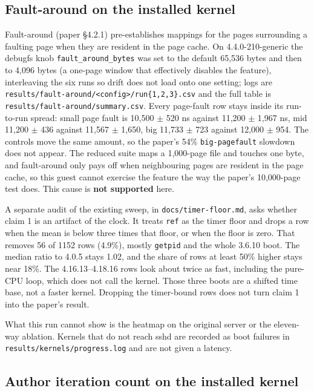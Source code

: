 \documentclass[11pt]{article}
\begin{document}
\subsection{Fault-around on the installed kernel}

Fault-around (paper \S4.2.1) pre-establishes mappings for the pages surrounding a faulting page when they are resident in the page cache. On 4.4.0-210-generic the debugfs knob \texttt{fault\_around\_bytes} was set to the default 65{,}536 bytes and then to 4{,}096 bytes (a one-page window that effectively disables the feature), interleaving the six runs so drift does not load onto one setting; logs are \texttt{results/fault-around/<config>/run\{1,2,3\}.csv} and the full table is \texttt{results/fault-around/summary.csv}. Every page-fault row stays inside its run-to-run spread: small page fault is 10{,}500 $\pm$ 520 ns against 11{,}200 $\pm$ 1{,}967 ns, mid 11{,}200 $\pm$ 436 against 11{,}567 $\pm$ 1{,}650, big 11{,}733 $\pm$ 723 against 12{,}000 $\pm$ 954. The controls move the same amount, so the paper's 54\% \texttt{big-pagefault} slowdown does not appear. The reduced suite maps a 1{,}000-page file and touches one byte, and fault-around only pays off when neighbouring pages are resident in the page cache, so this guest cannot exercise the feature the way the paper's 10{,}000-page test does. This cause is \textbf{not supported} here.

A separate audit of the existing sweep, in \texttt{docs/timer-floor.md}, asks whether claim 1 is an artifact of the clock. It treats \texttt{ref} as the timer floor and drops a row when the mean is below three times that floor, or when the floor is zero. That removes 56 of 1152 rows (4.9\%), mostly \texttt{getpid} and the whole 3.6.10 boot. The median ratio to 4.0.5 stays 1.02, and the share of rows at least 50\% higher stays near 18\%. The 4.16.13--4.18.16 rows look about twice as fast, including the pure-CPU loop, which does not call the kernel. Those three boots are a shifted time base, not a faster kernel. Dropping the timer-bound rows does not turn claim 1 into the paper's result.

What this run cannot show is the heatmap on the original server or the eleven-way ablation. Kernels that do not reach sshd are recorded as boot failures in \texttt{results/kernels/progress.log} and are not given a latency.

\subsection{Author iteration count on the installed kernel}
\end{document}

